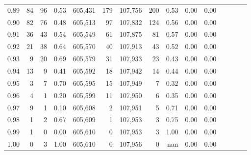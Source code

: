 \begin{tabular}{rrrcrrrrrrrrrrr}
0.89 &      84 &     96 &                                       0.53 &  605,431 &      179 &  107,756 &      200 &  0.53 &  0.00 &                         0.00 \\
0.90 &      82 &     76 &                                       0.48 &  605,513 &       97 &  107,832 &      124 &  0.56 &  0.00 &                         0.00 \\
0.91 &      36 &     43 &                                       0.54 &  605,549 &       61 &  107,875 &       81 &  0.57 &  0.00 &                         0.00 \\
0.92 &      21 &     38 &                                       0.64 &  605,570 &       40 &  107,913 &       43 &  0.52 &  0.00 &                         0.00 \\
0.93 &       9 &     20 &                                       0.69 &  605,579 &       31 &  107,933 &       23 &  0.43 &  0.00 &                         0.00 \\
0.94 &      13 &      9 &                                       0.41 &  605,592 &       18 &  107,942 &       14 &  0.44 &  0.00 &                         0.00 \\
0.95 &       3 &      7 &                                       0.70 &  605,595 &       15 &  107,949 &        7 &  0.32 &  0.00 &                         0.00 \\
0.96 &       4 &      1 &                                       0.20 &  605,599 &       11 &  107,950 &        6 &  0.35 &  0.00 &                         0.00 \\
0.97 &       9 &      1 &                                       0.10 &  605,608 &        2 &  107,951 &        5 &  0.71 &  0.00 &                         0.00 \\
0.98 &       1 &      2 &                                       0.67 &  605,609 &        1 &  107,953 &        3 &  0.75 &  0.00 &                         0.00 \\
0.99 &       1 &      0 &                                       0.00 &  605,610 &        0 &  107,953 &        3 &  1.00 &  0.00 &                         0.00 \\
1.00 &       0 &      3 &                                       1.00 &  605,610 &        0 &  107,956 &        0 &   nan &  0.00 &                         0.00 \\
\bottomrule
\end{tabular}
